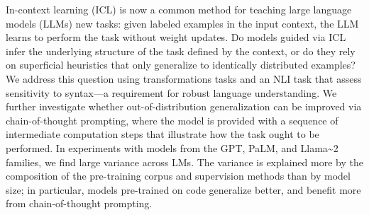 In-context learning (ICL) is now a common method for teaching large language models (LLMs) new tasks: given labeled examples in the input context, the LLM learns to perform the task without weight updates. Do models guided via ICL infer the underlying structure of the task defined by the context, or do they rely on superficial heuristics that only generalize to identically distributed examples? We address this question using transformations tasks and an NLI task that assess sensitivity to syntax—a requirement for robust language understanding. We further investigate whether out-of-distribution generalization can be improved via chain-of-thought prompting, where the model is provided with a sequence of intermediate computation steps that illustrate how the task ought to be performed. In experiments with models from the GPT, PaLM, and Llama\textasciitilde{}2 families, we find large variance across LMs. The variance is explained more by the composition of the pre-training corpus and supervision methods than by model size; in particular, models pre-trained on code generalize better, and benefit more from chain-of-thought prompting.